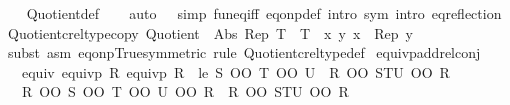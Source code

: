 \begin{isabellebody}
%
\isadelimproof
\ \ %
\endisadelimproof
%
\isatagproof
{}\isamarkupfalse%
\ Quotient{\isacharunderscore}{\kern0pt}def\isanewline
\ \ \isamarkupfalse%
\ {\isacharparenleft}{\kern0pt}auto\ {}\ {}\ simp{\isacharcolon}{\kern0pt}\ fun{\isacharunderscore}{\kern0pt}eq{\isacharunderscore}{\kern0pt}iff\ eq{\isacharunderscore}{\kern0pt}onp{\isacharunderscore}{\kern0pt}def\ intro{\isacharcolon}{\kern0pt}\ sym\ intro{\isacharbang}{\kern0pt}{\isacharcolon}{\kern0pt}\ eq{\isacharunderscore}{\kern0pt}reflection{\isacharparenright}{\kern0pt}%
\endisatagproof
{\isafoldproof}%
%
\isadelimproof
\isanewline
%
\endisadelimproof
\isanewline
{}\isamarkupfalse%
\ Quotient{\isacharunderscore}{\kern0pt}crel{\isacharunderscore}{\kern0pt}typecopy{\isacharcolon}{\kern0pt}\ {\isachardoublequoteopen}Quotient\ {\isacharparenleft}{\kern0pt}{\isacharequal}{\kern0pt}{\isacharparenright}{\kern0pt}\ Abs\ Rep\ T\ {\isasymLongrightarrow}\ T\ {\isasymequiv}\ {\isacharparenleft}{\kern0pt}{\isasymlambda}x\ y{\isachardot}{\kern0pt}\ x\ {\isacharequal}{\kern0pt}\ Rep\ y{\isacharparenright}{\kern0pt}{\isachardoublequoteclose}\isanewline
%
\isadelimproof
\ \ %
\endisadelimproof
%
\isatagproof
{}\isamarkupfalse%
\ {\isacharparenleft}{\kern0pt}subst\ {\isacharparenleft}{\kern0pt}asm{\isacharparenright}{\kern0pt}\ eq{\isacharunderscore}{\kern0pt}onp{\isacharunderscore}{\kern0pt}True{\isacharbrackleft}{\kern0pt}symmetric{\isacharbrackright}{\kern0pt}{\isacharparenright}{\kern0pt}\ {\isacharparenleft}{\kern0pt}rule\ Quotient{\isacharunderscore}{\kern0pt}crel{\isacharunderscore}{\kern0pt}typedef{\isacharparenright}{\kern0pt}%
\endisatagproof
{\isafoldproof}%
%
\isadelimproof
\isanewline
%
\endisadelimproof
\isanewline
{}\isamarkupfalse%
\ equivp{\isacharunderscore}{\kern0pt}add{\isacharunderscore}{\kern0pt}relconj{\isacharcolon}{\kern0pt}\isanewline
\ \ \ equiv{\isacharcolon}{\kern0pt}\ {\isachardoublequoteopen}equivp\ R{\isachardoublequoteclose}\ {\isachardoublequoteopen}equivp\ R{\isacharprime}{\kern0pt}{\isachardoublequoteclose}\ \ le{\isacharcolon}{\kern0pt}\ {\isachardoublequoteopen}S\ OO\ T\ OO\ U\ {\isasymle}\ R\ OO\ STU\ OO\ R{\isacharprime}{\kern0pt}{\isachardoublequoteclose}\isanewline
\ \ \ {\isachardoublequoteopen}R\ OO\ S\ OO\ T\ OO\ U\ OO\ R{\isacharprime}{\kern0pt}\ {\isasymle}\ R\ OO\ STU\ OO\ R{\isacharprime}{\kern0pt}{\isachardoublequoteclose}\isanewline
%
\isadelimproof
%
\endisadelimproof
%
\isatagproof
{}\isamarkupfalse%

\end{isabellebody}
